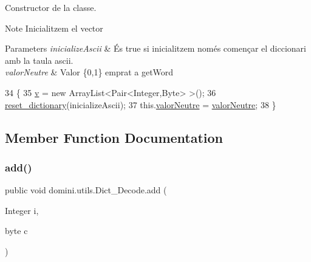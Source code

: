 Constructor de la classe. 

\begin{DoxyNote}{Note}
Inicialitzem el vector 
\end{DoxyNote}

\begin{DoxyParams}{Parameters}
{\em inicialize\+Ascii} & És true si inicialitzem només començar el diccionari amb la taula ascii. \\
\hline
{\em valor\+Neutre} & Valor \{0,1\} emprat a get\+Word \\
\hline
\end{DoxyParams}

\begin{DoxyCode}
34                                                                      \{
35         \hyperlink{classdomini_1_1utils_1_1Dict__Decode_a351bb8836b391e5e21ebc9cc1943a22d}{v} = \textcolor{keyword}{new} ArrayList<Pair<Integer,Byte> >();
36         \hyperlink{classdomini_1_1utils_1_1Dict__Decode_a635432505df1ceaa58a987bb80c6b0a3}{reset\_dictionary}(inicializeAscii);
37         this.\hyperlink{classdomini_1_1utils_1_1Dict__Decode_a6ef2d17f449cf7a658a4bf983e2fb474}{valorNeutre} = \hyperlink{classdomini_1_1utils_1_1Dict__Decode_a6ef2d17f449cf7a658a4bf983e2fb474}{valorNeutre};
38     \}
\end{DoxyCode}


\subsection{Member Function Documentation}
\mbox{\label{classdomini_1_1utils_1_1Dict__Decode_a077011e4507db308d143ea9b7146abb9}} 
\subsubsection{\texorpdfstring{add()}{add()}}
{\footnotesize\ttfamily public void domini.\+utils.\+Dict\+\_\+\+Decode.\+add (\begin{DoxyParamCaption}\item[{Integer}]{i,  }\item[{byte}]{c }\end{DoxyParamCaption})\hspace{0.3cm}{\ttfamily [inline]}}



